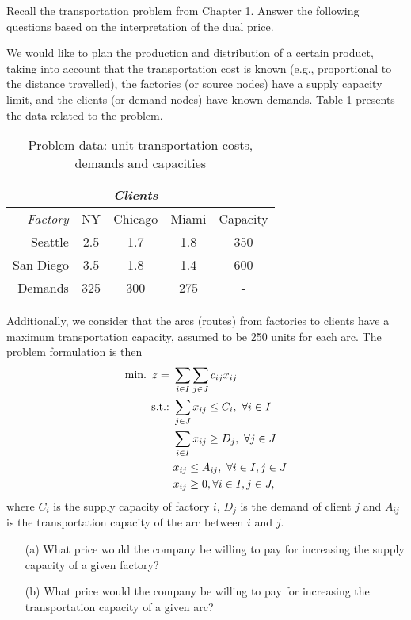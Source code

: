 Recall the transportation problem from Chapter 1. Answer the following questions based on the interpretation of the dual price. 


We would like to plan the production and distribution of a certain product, taking into account that the transportation cost is known (e.g., proportional to the distance travelled), the factories (or source nodes) have a supply capacity limit, and the clients (or demand nodes) have known demands. Table \ref{p1c5:tab:E51_transport_problem_data} presents the data related to the problem. 

%
\begin{table}[h]
	\begin{tabular}{r|ccc|c}
    	& & {\it Clients} &\\\hline
    	{\it Factory} & NY & Chicago & Miami & Capacity \\\hline
    	Seattle & 2.5      & 1.7    & 1.8   & 350 \\
    	San Diego & 3.5 & 1.8 & 1.4 & 600 \\\hline
    	Demands & 325 & 300 & 275 & - \\\hline
	\end{tabular}
	\caption{Problem data: unit transportation costs, demands and capacities} \label{p1c5:tab:E51_transport_problem_data}
\end{table}
%
Additionally, we consider that the arcs (routes) from factories to clients have a maximum transportation capacity, assumed to be 250 units for each arc. The problem formulation is then 
%
\begin{align*}
	\mathop{\text{min.~}} z = \ &\sum_{i \in I}\sum_{j \in J}c_{ij}x_{ij} \\
	\mathop{\text{s.t.:~}} & \sum_{j \in J} x_{ij} \leq C_i, ~\forall i \in I \\
	& \sum_{i \in I} x_{ij} \geq D_j, ~\forall j \in J \\
	& x_{ij} \leq A_{ij}, ~\forall i \in I, j \in J \\
	& x_{ij} \geq 0, \forall i \in I, j \in J,
\end{align*}
%
where $C_i$ is the supply capacity of factory $i$, $D_j$ is the demand of client $j$ and $A_{ij}$ is the transportation capacity of the arc between $i$ and $j$.

\begin{itemize}
	\item[(a)] What price would the company be willing to pay for increasing the supply capacity of a given factory?
	\item[(b)] What price would the company be willing to pay for increasing the transportation capacity of a given arc?
\end{itemize}